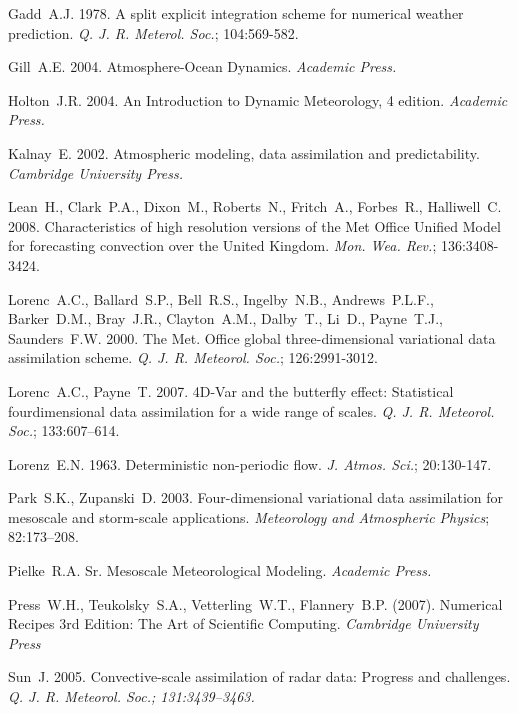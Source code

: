 \documentclass[times]{qjrms4}
\begin{document}
\begin{thebibliography}
Gadd~A.J. 1978. A split explicit integration scheme for numerical weather prediction.
\emph{Q. J. R. Meterol. Soc.}; 104:569-582.

Gill~A.E. 2004. Atmosphere-Ocean Dynamics. 
\emph{Academic Press.} 

Holton~J.R. 2004. An Introduction to Dynamic Meteorology, 4 edition. 
\emph{Academic Press.} 

Kalnay~E. 2002. Atmospheric modeling, data assimilation and predictability.
\emph{Cambridge University Press.}

Lean~H., Clark~P.A., Dixon~M., Roberts~N., Fritch~A., Forbes~R., Halliwell~C. 2008. Characteristics of high resolution versions of the Met Office Unified Model for forecasting convection over the United Kingdom.
\emph{Mon. Wea. Rev.}; 136:3408-3424.

Lorenc~A.C., Ballard~S.P., Bell~R.S., Ingelby~N.B., Andrews~P.L.F., Barker~D.M., Bray~J.R., Clayton~A.M., Dalby~T., Li~D., Payne~T.J., Saunders~F.W. 2000. The Met. Office global three-dimensional variational data assimilation scheme. 
\emph{Q. J. R. Meteorol. Soc.}; 126:2991-3012.

Lorenc~A.C., Payne~T. 2007. 4D-Var and the butterfly effect: Statistical fourdimensional
data assimilation for a wide range of scales. 
\emph{Q. J. R. Meteorol. Soc.}; 133:607–614.

Lorenz~E.N. 1963. Deterministic non-periodic flow.
\emph{J. Atmos. Sci.}; 20:130-147.


Park~S.K., Zupanski~D. 2003. Four-dimensional variational data assimilation for
mesoscale and storm-scale applications. 
\emph{Meteorology and Atmospheric Physics}; 82:173–208.

Pielke~R.A. Sr. Mesoscale Meteorological Modeling.
\emph{Academic Press.}

Press~W.H., Teukolsky~S.A., Vetterling~W.T., Flannery~B.P. (2007). Numerical Recipes 3rd Edition: The Art of Scientific Computing.
\emph{Cambridge University Press}

Sun~J. 2005. Convective-scale assimilation of radar data: Progress and challenges. 
\emph{Q. J. R. Meteorol. Soc.;  131:3439–3463.}


\end{thebibliography}
\end{document}
